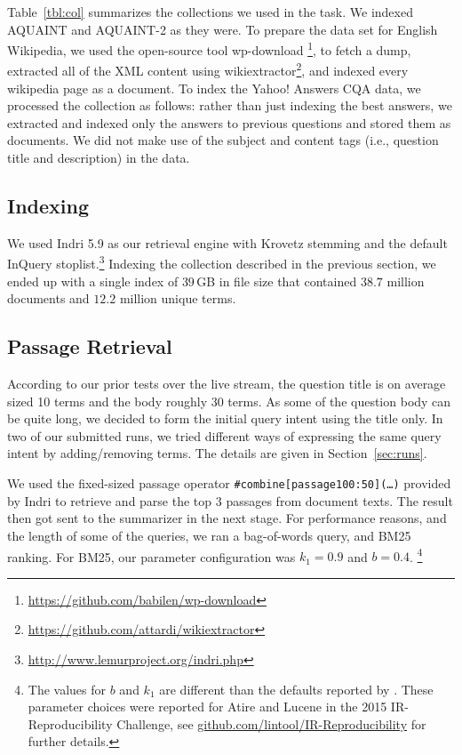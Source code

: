 \documentclass[a4paper,10pt,conference,compsocconf,final]{IEEEtran}
\newcommand\method[1]{{\sf\small{#1}}}
\newcommand\gb[1]{$#1$\,GB}
\begin{document}
{{{{Table~{\ref{tbl:col}} summarizes the collections we used in the task.  We
indexed AQUAINT and AQUAINT-2 as they were.  To prepare the data set for
English Wikipedia, we used the open-source tool {\method{wp-download}}
\footnote{\url{https://github.com/babilen/wp-download}}, to fetch a dump, extracted
all of the XML content using
{\method{wikiextractor}}\footnote{\url{https://github.com/attardi/wikiextractor}},
and indexed every wikipedia page as a document.  To index the Yahoo!  Answers
CQA data, we processed the collection as follows: rather than just indexing the
best answers, we extracted and indexed only the answers to previous questions
and stored them as documents.  We did not make use of the subject and content
tags (i.e., question title and description) in the data.  

\subsection{Indexing}
We used Indri 5.9 as
our retrieval engine with Krovetz stemming and the default InQuery
stoplist.\footnote{\url{http://www.lemurproject.org/indri.php}} Indexing the
collection described in the previous section, we ended up with a
single index of \gb{39} in file size that contained $38.7$ million documents
and $12.2$ million unique terms.

\subsection{Passage Retrieval}
\label{sec:passage}

According to our prior tests over the live stream, the question title is on
average sized 10 terms and the body roughly 30 terms.  As some of the question
body can be quite long, we decided to form the initial query intent using
the title only.  In two of our submitted runs, we tried different ways of
expressing the same query intent by adding/removing terms.  The details are
given in Section~\ref{sec:runs}.

We used the fixed-sized passage operator \texttt{\#combine[passage100:50](\ldots)} 
provided by Indri to retrieve and parse the top 3 passages from
document texts.  The result then got sent to the summarizer in the next stage.
For performance reasons, and the length of some of the queries, we ran a
bag-of-words query, and BM25 ranking.  For BM25, our parameter configuration
was $k_1=0.9$ and $b=0.4$.  \footnote{The values for $b$ and $k_1$ are
different than the defaults reported by {\citet{rwj+94-trec}}.  These parameter
choices were reported for Atire and Lucene in the 2015 IR-Reproducibility
Challenge, see {\url{github.com/lintool/IR-Reproducibility}} for further
details.}  

}}}}
\end{document}
